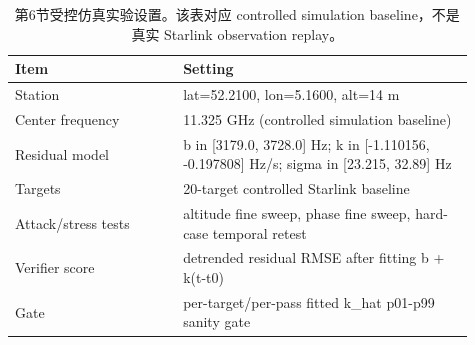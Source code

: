 \begin{table}[htbp]
\centering
\caption{第6节受控仿真实验设置。该表对应 controlled simulation baseline，不是真实 Starlink observation replay。}
\label{tab:section6\_experiment\_settings}
\begin{tabular}{p{0.33\linewidth}p{0.58\linewidth}}
\hline
Item & Setting \\
\hline
Station & lat=52.2100, lon=5.1600, alt=14 m \\
Center frequency & 11.325 GHz (controlled simulation baseline) \\
Residual model & b in [3179.0, 3728.0] Hz; k in [-1.110156, -0.197808] Hz/s; sigma in [23.215, 32.89] Hz \\
Targets & 20-target controlled Starlink baseline \\
Attack/stress tests & altitude fine sweep, phase fine sweep, hard-case temporal retest \\
Verifier score & detrended residual RMSE after fitting b + k(t-t0) \\
Gate & per-target/per-pass fitted k\_hat p01-p99 sanity gate \\
\hline
\end{tabular}
\end{table}

